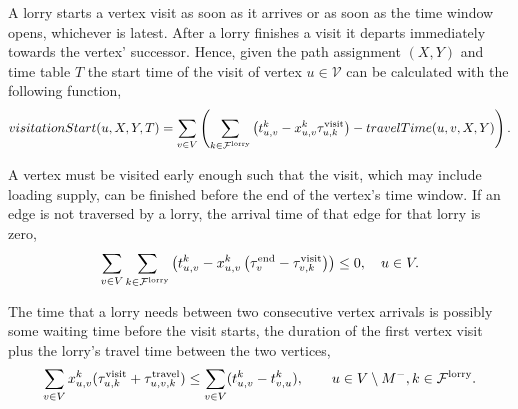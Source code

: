 A lorry starts a vertex visit as soon as it arrives or as soon as the time window opens, whichever is latest.
After a lorry finishes a visit it departs immediately towards the vertex' successor.
Hence, given the path assignment $(X,Y)$ and time table $T$ the start time of the visit of vertex $u \in \mathcal V$ can be calculated with the following function,
\begin{align}
  visitationStart(u,X,Y,T) =
  \sum_{v \in V}
  \left(
  \sum_{k \in \mathcal F^{\rm lorry}}
  \left(
  t_{u,v}^k -
  x^k_{u,v}
   \tau_{u,k}^{\rm visit}
   \right)
  -
  travelTime(u,v,X,Y)
  \right).
  \notag
\end{align}


A vertex must be visited early enough such that the visit, which may include loading supply, can be finished before the end of the vertex's time window. If an edge is not traversed by a lorry, the arrival time of that edge for that lorry is zero,
\begin{align}
  \label{eq:time-window}
    \sum_{v \in V} \sum_{k \in \mathcal F^{\rm lorry}}
    \left( t^k_{u,v}  -
     x^{k}_{u,v} \left(
    \tau^{\rm end}_v - \tau^{\rm visit}_{v,k}
    \right)  \right) \leq 0,
    \quad
    u \in  V .
  \end{align}

The time that a lorry needs between two consecutive vertex arrivals is possibly some waiting time before the visit starts, the duration of the first vertex visit plus the lorry's travel time between the two vertices,
\begin{align}
  \label{eq:time-hard-first}
  \sum_{v\in V} x_{u,v}^k (\tau_{u,k}^{\rm visit} + \tau_{u,v,k}^{\rm travel}) \leq \sum_{v \in V} (t_{u,v}^k - t_{v,u}^k),
  \qquad u\in V \setminus M^-, k \in \mathcal{F}^{\rm lorry}.
\end{align}




